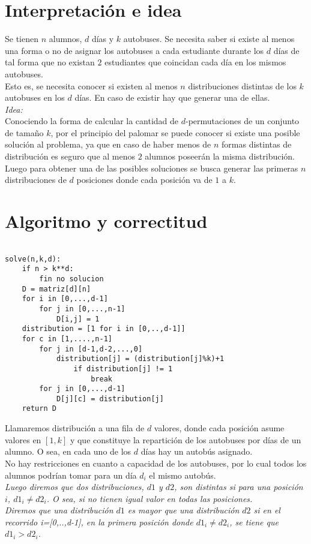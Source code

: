 \documentclass[12pt]{article}
\begin{document}
\section{Interpretación e idea}
  
Se tienen $n$ alumnos, $d$ d\'ias y $k$ autobuses. Se necesita saber si existe al menos una forma o no de asignar los autobuses a cada estudiante durante los $d$ d\'ias de tal forma que no existan $2$ estudiantes que coincidan cada 
d\'ia en los mismos autobuses.\\
Esto es, se necesita conocer si existen al menos $n$ distribuciones distintas de los $k$ autobuses en los $d$ d\'ias.
 En caso de existir hay que generar una de ellas.\\
\textit{Idea:}\\
Conociendo la forma de calcular la cantidad de $d$-permutaciones de un conjunto de tama\~no $k$, por el principio del palomar se puede conocer si existe una posible soluci\'on al problema, ya que en caso de haber menos de $n$ formas distintas de distribuci\'on es seguro que al menos $2$ alumnos poseer\'an la misma distribuci\'on.\\
Luego para obtener una de las posibles soluciones se busca generar las primeras $n$ distribuciones de $d$ 
posiciones donde cada posici\'on va de $1$ a $k$.\\

\newpage

\section{Algoritmo y correctitud}

\begin{verbatim}

solve(n,k,d):
    if n > k**d:
        fin no solucion
    D = matriz[d][n]
    for i in [0,...,d-1]
        for j in [0,...,n-1]
            D[i,j] = 1
    distribution = [1 for i in [0,..,d-1]]
    for c in [1,....,n-1]
        for j in [d-1,d-2,...,0]
            distribution[j] = (distribution[j]%k)+1
                if distribution[j] != 1
                    break
        for j in [0,...,d-1]
            D[j][c] = distribution[j]
    return D 
\end{verbatim}


Llamaremos distribuci\'on a una fila de $d$ valores, donde cada posici\'on asume valores en $[1,k]$ y que constituye la repartici\'on de los autobuses por d\'ias de un alumno. O sea, en cada uno de los $d$ d\'ias hay un autob\'us asignado.\\
No hay restricciones en cuanto a capacidad de los autobuses, por lo cual todos los alumnos podr\'ian tomar para
 un d\'ia $d_i$ el mismo autob\'us.\\
\textit{Luego diremos que dos distribuciones, $d1$ y $d2$, son distintas si para una posici\'on $i$, $d1_i\neq d2_i$. O sea, si no tienen igual valor en todas las posiciones.}\\
\textit{Diremos que una distribuci\'on $d1$ es mayor que una distribuci\'on $d2$ si en el recorrido i=[0,..,d-1], en la primera posici\'on donde $d1_i\neq d2_i$, se tiene que $d1_i > d2_i$.}\\
\end{document}
